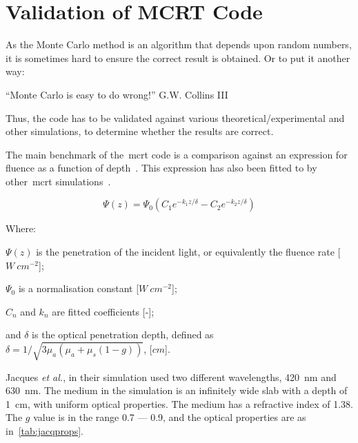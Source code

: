 \FloatBarrier
\section{Validation of MCRT Code}\label{sec:validation}

As the Monte Carlo method is an algorithm that depends upon random numbers, it is sometimes hard to ensure the correct result is obtained.
Or to put it another way:
\medskip

``Monte Carlo is easy to do wrong!'' G.W. Collins III~\cite{bjormaneasymonte}

\medskip

Thus, the code has to be validated against various theoretical/experimental and other simulations, to determine whether the results are correct.

The main benchmark of the~\gls*{mcrt} code is a comparison against an expression for fluence as a function of depth~\cite{gardner1993fluorescence}.
This expression has also been fitted to by other~\gls*{mcrt} simulations~\cite{jacques1993photobleaching}.

\begin{equation}
\Psi(z)=\Psi_0(C_1e^{-k_1z/\delta}-C_2e^{-k_2z/\delta})
\label{eqn:jacqmatch}
\end{equation}

\noindent Where:

\indent $\Psi(z)$ is the penetration of the incident light, or equivalently the fluence rate [$W\ cm^{-2}$];

\indent $\Psi_0$ is a normalisation constant [$W\ cm^{-2}$];

\indent $C_n$ and $k_n$ are fitted coefficients [-];

\indent and $\delta$ is the optical penetration depth, defined as $\delta=1/\sqrt{3\mu_a(\mu_a+\mu_s(1-g))}$, [$cm$].

\medskip

Jacques \textit{et al.}, in their simulation used two different wavelengths, 420~nm and 630~nm.
The medium in the simulation is an infinitely wide slab with a depth of 1~cm, with uniform optical properties. 
The medium has a refractive index of 1.38.
The $g$ value is in the range 0.7 --- 0.9, and the optical properties are as in~\cref{tab:jacqprops}.

